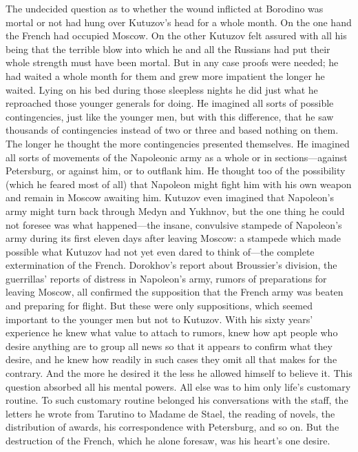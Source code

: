The undecided question as to whether the wound inflicted at
Borodino was mortal or not had hung over Kutuzov's head for a
whole month. On the one hand the French had occupied Moscow. On
the other Kutuzov felt assured with all his being that the
terrible blow into which he and all the Russians had put their
whole strength must have been mortal. But in any case proofs were
needed; he had waited a whole month for them and grew more
impatient the longer he waited. Lying on his bed during those
sleepless nights he did just what he reproached those younger
generals for doing. He imagined all sorts of possible
contingencies, just like the younger men, but with this
difference, that he saw thousands of contingencies instead of two
or three and based nothing on them. The longer he thought the
more contingencies presented themselves. He imagined all sorts of
movements of the Napoleonic army as a whole or in
sections---against Petersburg, or against him, or to outflank
him. He thought too of the possibility (which he feared most of
all) that Napoleon might fight him with his own weapon and remain
in Moscow awaiting him. Kutuzov even imagined that Napoleon's
army might turn back through Medyn and Yukhnov, but the one thing
he could not foresee was what happened---the insane, convulsive
stampede of Napoleon's army during its first eleven days after
leaving Moscow: a stampede which made possible what Kutuzov had
not yet even dared to think of---the complete extermination of
the French. Dorokhov's report about Broussier's division, the
guerrillas' reports of distress in Napoleon's army, rumors of
preparations for leaving Moscow, all confirmed the supposition
that the French army was beaten and preparing for flight. But
these were only suppositions, which seemed important to the
younger men but not to Kutuzov. With his sixty years' experience
he knew what value to attach to rumors, knew how apt people who
desire anything are to group all news so that it appears to
confirm what they desire, and he knew how readily in such cases
they omit all that makes for the contrary. And the more he
desired it the less he allowed himself to believe it. This
question absorbed all his mental powers. All else was to him only
life's customary routine. To such customary routine belonged his
conversations with the staff, the letters he wrote from Tarutino
to Madame de Stael, the reading of novels, the distribution of
awards, his correspondence with Petersburg, and so on. But the
destruction of the French, which he alone foresaw, was his
heart's one desire.

